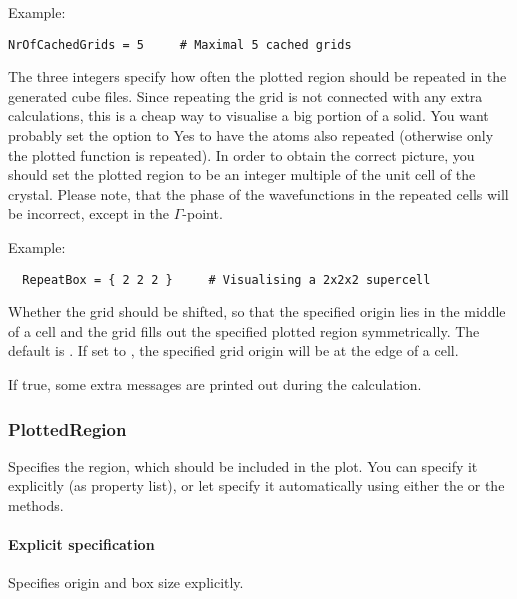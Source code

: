 \begin{description}
Example:
\begin{verbatim}
NrOfCachedGrids = 5     # Maximal 5 cached grids
\end{verbatim}

\item[\is{RepeatBox}] The three integers specify how often the plotted
  region should be repeated in the generated cube files. Since
  repeating the grid is not connected with any extra calculations,
  this is a cheap way to visualise a big portion of a solid.  You want
  probably set the  option to Yes to have the
  atoms also repeated (otherwise only the plotted function is
  repeated).  In order to obtain the correct picture, you should set
  the plotted region to be an integer multiple of the unit cell of the
  crystal. Please note, that the phase of the wavefunctions in the
  repeated cells will be incorrect, except in the $\Gamma$-point.

Example:
\begin{verbatim}
  RepeatBox = { 2 2 2 }     # Visualising a 2x2x2 supercell
\end{verbatim}

\item[\is{ShiftGrid}] Whether the grid should be shifted, so that the specified
  origin lies in the middle of a cell and the grid fills out the specified
  plotted region symmetrically. The default is . If set to , the
  specified grid origin will be at the edge of a cell.

\item[\is{Verbose}] If true, some extra messages are printed out
  during the calculation.

\end{description}


\subsubsection{PlottedRegion}
\label{sec:waveplot.PlottedRegion}

Specifies the region, which should be included in the plot. You can
specify it explicitly (as property list), or let \waveplot{} specify
it automatically using either the  or the
 methods.

\paragraph{Explicit specification}
Specifies origin and box size explicitly.

